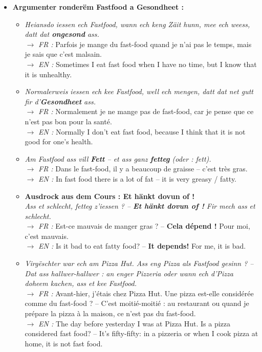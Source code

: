 \begin{itemize}
    \item \textbf{Argumenter ronderëm Fastfood a Gesondheet :}
    \begin{itemize}
        \item \textit{Heiansdo iessen ech Fastfood, wann ech keng Zäit hunn, mee ech weess, datt dat \textbf{ongesond} ass.} \\
        $\rightarrow$ \textit{FR :} Parfois je mange du fast-food quand je n'ai pas le temps, mais je sais que c'est malsain. \\
        $\rightarrow$ \textit{EN :} Sometimes I eat fast food when I have no time, but I know that it is unhealthy.
        \item \textit{Normalerweis iessen ech kee Fastfood, well ech mengen, datt dat net gutt fir d'\textbf{Gesondheet} ass.} \\
        $\rightarrow$ \textit{FR :} Normalement je ne mange pas de fast-food, car je pense que ce n'est pas bon pour la santé. \\
        $\rightarrow$ \textit{EN :} Normally I don't eat fast food, because I think that it is not good for one's health.
        \item \textit{Am Fastfood ass vill \textbf{Fett} -- et ass ganz \textbf{fetteg} (oder : fett).} \\
        $\rightarrow$ \textit{FR :} Dans le fast-food, il y a beaucoup de graisse -- c'est très gras. \\
        $\rightarrow$ \textit{EN :} In fast food there is a lot of fat -- it is very greasy / fatty.
        \item \textbf{Ausdrock aus dem Cours : \flqq Et hänkt dovun of !\frqq} \\
        \textit{Ass et schlecht, fetteg z'iessen ? -- \textbf{Et hänkt dovun of !} Fir mech ass et schlecht.} \\
        $\rightarrow$ \textit{FR :} Est-ce mauvais de manger gras ? -- \textbf{Cela dépend !} Pour moi, c'est mauvais. \\
        $\rightarrow$ \textit{EN :} Is it bad to eat fatty food? -- \textbf{It depends!} For me, it is bad.
        \item \textit{Virgëschter war ech am Pizza Hut. Ass eng Pizza als Fastfood gesinn ? -- Dat ass hallwer-hallwer : an enger Pizzeria oder wann ech d'Pizza doheem kachen, ass et kee Fastfood.} \\
        $\rightarrow$ \textit{FR :} Avant-hier, j'étais chez Pizza Hut. Une pizza est-elle considérée comme du fast-food ? -- C'est moitié-moitié : au restaurant ou quand je prépare la pizza à la maison, ce n'est pas du fast-food. \\
        $\rightarrow$ \textit{EN :} The day before yesterday I was at Pizza Hut. Is a pizza considered fast food? -- It's fifty-fifty: in a pizzeria or when I cook pizza at home, it is not fast food.
    \end{itemize}
\end{itemize}

